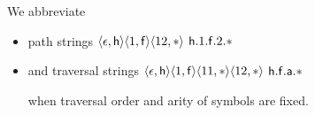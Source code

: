 
\begin{notation}
	We abbreviate
	\begin{itemize}
		\item path strings
		$\langle\epsilon,{\mathsf h}\rangle\langle1,{\mathsf f}\rangle\langle12,*\rangle$
		\hfill ${\mathsf h}.1.{\mathsf f}.2.{*}$
		\item and traversal strings
		$\langle\epsilon,{\mathsf h}\rangle\langle1,{\mathsf f}\rangle\langle11,*\rangle\langle12,*\rangle$
		\hfill ${\mathsf h}.{\mathsf f}.{\mathsf a}.{*}$
		
		when traversal order and arity of symbols are fixed.
	\end{itemize}
\end{notation}